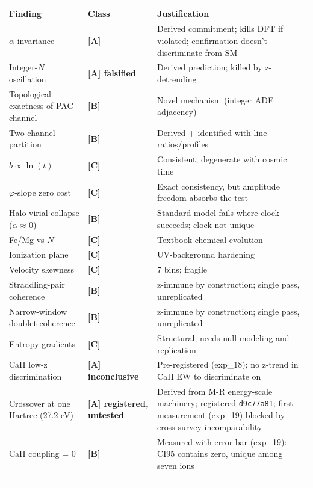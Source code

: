 \documentclass[11pt,a4paper]{article}
\begin{document}
\begin{longtable}[]{@{}lll@{}}
\toprule
Finding & Class & Justification \\
\midrule\endhead
$\alpha$ invariance & \textbf{[A]} & Derived commitment; kills DFT if violated; confirmation doesn't discriminate from SM \\
Integer-$N$ oscillation & \textbf{[A] falsified} & Derived prediction; killed by z-detrending \\
Topological exactness of PAC channel & \textbf{[B]} & Novel mechanism (integer ADE adjacency) \\
Two-channel partition & \textbf{[B]} & Derived + identified with line ratios/profiles \\
$b \propto \ln(t)$ & \textbf{[C]} & Consistent; degenerate with cosmic time \\
$\varphi$-slope zero cost & \textbf{[C]} & Exact consistency, but amplitude freedom absorbs the test \\
Halo virial collapse ($\alpha \approx 0$) & \textbf{[B]} & Standard model fails where clock succeeds; clock not unique \\
Fe/Mg vs $N$ & \textbf{[C]} & Textbook chemical evolution \\
Ionization plane & \textbf{[C]} & UV-background hardening \\
Velocity skewness & \textbf{[C]} & 7 bins; fragile \\
Straddling-pair coherence & \textbf{[B]} & z-immune by construction; single pass, unreplicated \\
Narrow-window doublet coherence & \textbf{[B]} & z-immune by construction; single pass, unreplicated \\
Entropy gradients & \textbf{[C]} & Structural; needs null modeling and replication \\
CaII low-z discrimination & \textbf{[A] inconclusive} & Pre-registered (exp\_18); no z-trend in CaII EW to discriminate on \\
Crossover at one Hartree (27.2 eV) & \textbf{[A] registered, untested} & Derived from M-R energy-scale machinery; registered \texttt{d9c77a81}; first measurement (exp\_19) blocked by cross-survey incomparability \\
CaII coupling = 0 & \textbf{[B]} & Measured with error bar (exp\_19): CI95 contains zero, unique among seven ions \\
\bottomrule
\end{longtable}

\begin{center}\rule{0.5\linewidth}{0.4pt}\end{center}
\end{document}
